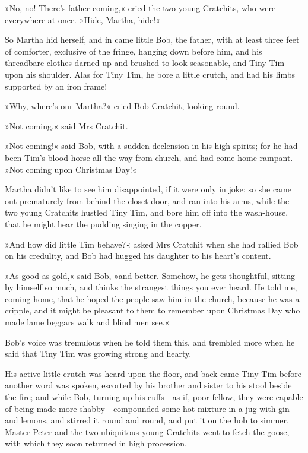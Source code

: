 »No, no! There's father coming,« cried the two young Cratchits, who were everywhere at once. »Hide, Martha, hide!«


So Martha hid herself, and in came little Bob, the father, with at least three feet of comforter, exclusive of the fringe, hanging down before him, and his threadbare clothes darned up and brushed to look seasonable, and Tiny Tim upon his shoulder. Alas for Tiny Tim, he bore a little crutch, and had his limbs supported by an iron frame!



»Why, where's our Martha?« cried Bob Cratchit, looking round.

»Not coming,« said Mrs Cratchit.


»Not coming!« said Bob, with a sudden declension in his high spirits; for he had been Tim's blood-horse all the way from church, and had come home rampant. »Not coming upon Christmas Day!«

Martha didn't like to see him disappointed, if it were only in joke; so she came out prematurely from behind the closet door, and ran into his arms, while the two young Cratchits hustled Tiny Tim, and bore him off into the wash-house, that he might hear the pudding singing in the copper.

»And how did little Tim behave?« asked Mrs Cratchit when she had rallied Bob on his credulity, and Bob had hugged his daughter to his heart's content.


»As good as gold,« said Bob, »and better. Somehow, he gets  thoughtful, sitting by himself so much, and thinks the strangest things you ever heard. He told me, coming home, that he hoped the people saw him in the church, because he was a cripple, and it might be pleasant to them to remember upon Christmas Day who made lame beggars walk and blind men see.«



Bob's voice was tremulous when he told them this, and trem\-bled more when he said that Tiny Tim was growing strong and hearty.

His active little crutch was heard upon the floor, and back came Tiny Tim before another word was spoken, escorted by his brother and sister to his stool beside the fire; and while Bob, turning up his cuffs—as if, poor fellow, they were capable of being made more shabby—compounded some hot mixture in a jug with gin and lemons, and stirred it round and round, and put it on the hob to simmer, Master Peter and the two ubiquitous young Cratchits went to fetch the goose, with which they soon returned in high procession.




